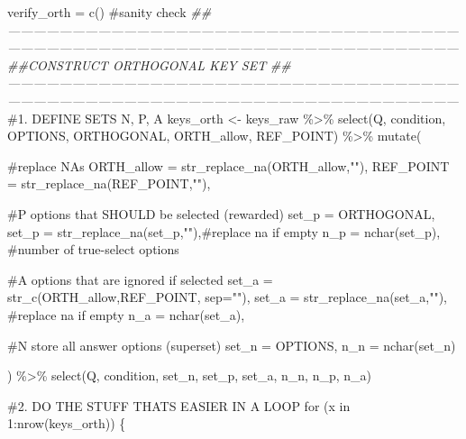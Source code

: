 \documentclass[
  letterpaper,
  DIV=11,
  numbers=noendperiod]{scrreprt}
\newenvironment{Shaded}{\begin{snugshade}}{\end{snugshade}}
\newcommand{\AttributeTok}[1]{\textcolor[rgb]{0.40,0.45,0.13}{#1}}
\newcommand{\CommentTok}[1]{\textcolor[rgb]{0.37,0.37,0.37}{#1}}
\newcommand{\ControlFlowTok}[1]{\textcolor[rgb]{0.00,0.23,0.31}{#1}}
\newcommand{\DecValTok}[1]{\textcolor[rgb]{0.68,0.00,0.00}{#1}}
\newcommand{\DocumentationTok}[1]{\textcolor[rgb]{0.37,0.37,0.37}{\textit{#1}}}
\newcommand{\FunctionTok}[1]{\textcolor[rgb]{0.28,0.35,0.67}{#1}}
\newcommand{\NormalTok}[1]{\textcolor[rgb]{0.00,0.23,0.31}{#1}}
\newcommand{\OtherTok}[1]{\textcolor[rgb]{0.00,0.23,0.31}{#1}}
\newcommand{\SpecialCharTok}[1]{\textcolor[rgb]{0.37,0.37,0.37}{#1}}
\newcommand{\StringTok}[1]{\textcolor[rgb]{0.13,0.47,0.30}{#1}}
\begin{document}
\begin{Shaded}
\begin{Highlighting}[]
\NormalTok{verify\_orth }\OtherTok{=} \FunctionTok{c}\NormalTok{() }\CommentTok{\#sanity check}
\DocumentationTok{\#\#——————————————————————————————————————————————————————————————————————}
\DocumentationTok{\#\#CONSTRUCT ORTHOGONAL KEY SET}
\DocumentationTok{\#\#——————————————————————————————————————————————————————————————————————}
\CommentTok{\#1. DEFINE SETS N, P, A}
\NormalTok{keys\_orth }\OtherTok{\textless{}{-}}\NormalTok{ keys\_raw }\SpecialCharTok{\%\textgreater{}\%} 
  \FunctionTok{select}\NormalTok{(Q, condition, OPTIONS, ORTHOGONAL, ORTH\_allow, REF\_POINT) }\SpecialCharTok{\%\textgreater{}\%} 
  \FunctionTok{mutate}\NormalTok{(}
    
    \CommentTok{\#replace NAs }
    \AttributeTok{ORTH\_allow =} \FunctionTok{str\_replace\_na}\NormalTok{(ORTH\_allow,}\StringTok{""}\NormalTok{),}
    \AttributeTok{REF\_POINT =} \FunctionTok{str\_replace\_na}\NormalTok{(REF\_POINT,}\StringTok{""}\NormalTok{),}
    
    \CommentTok{\#P options that SHOULD be selected (rewarded)}
    \AttributeTok{set\_p =}\NormalTok{ ORTHOGONAL,}
    \AttributeTok{set\_p =} \FunctionTok{str\_replace\_na}\NormalTok{(set\_p,}\StringTok{""}\NormalTok{),}\CommentTok{\#replace na if empty}
    \AttributeTok{n\_p =} \FunctionTok{nchar}\NormalTok{(set\_p), }\CommentTok{\#number of true{-}select options}
    
    \CommentTok{\#A options that are ignored if selected }
    \AttributeTok{set\_a =} \FunctionTok{str\_c}\NormalTok{(ORTH\_allow,REF\_POINT, }\AttributeTok{sep=}\StringTok{""}\NormalTok{),}
    \AttributeTok{set\_a =} \FunctionTok{str\_replace\_na}\NormalTok{(set\_a,}\StringTok{""}\NormalTok{), }\CommentTok{\#replace na if empty}
    \AttributeTok{n\_a =} \FunctionTok{nchar}\NormalTok{(set\_a),}
    
    \CommentTok{\#N store all answer options (superset)}
    \AttributeTok{set\_n =}\NormalTok{ OPTIONS,  }
    \AttributeTok{n\_n =} \FunctionTok{nchar}\NormalTok{(set\_n)}
  
\NormalTok{) }\SpecialCharTok{\%\textgreater{}\%} \FunctionTok{select}\NormalTok{(Q, condition, set\_n, set\_p, set\_a, n\_n, n\_p, n\_a)}

\CommentTok{\#2. DO THE STUFF THAT\textquotesingle{}S EASIER IN A LOOP}
\ControlFlowTok{for}\NormalTok{ (x }\ControlFlowTok{in} \DecValTok{1}\SpecialCharTok{:}\FunctionTok{nrow}\NormalTok{(keys\_orth)) \{}
  

\end{Highlighting}
\end{Shaded}
\end{document}
